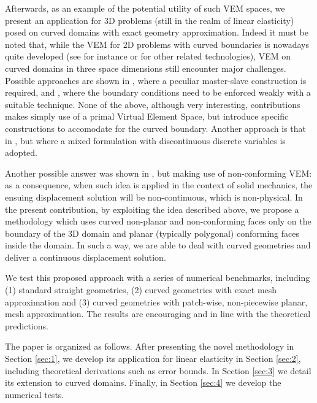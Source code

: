 \documentclass[a4paper,11pt]{article}
\theoremstyle{remark}
\theoremstyle{definition}
\begin{document}
Afterwards, as an example of the potential utility of such VEM spaces, we present an application for 3D problems (still in the realm of linear elasticity) posed on curved domains with exact geometry approximation. Indeed it must be noted that, while the VEM for 2D problems with curved boundaries is nowadays quite developed (see for instance \cite{BeiraodaVeiga-Russo-Vacca:2019, BeiraodaVeiga-Brezzi-Marini-Russo:2020, Aldakheel2020, art-bdv-das, wriggers2020virtual, Dassi-Fumagalli-Losapio-Scialo-Scotti-Vacca,Dassi-Fumagalli-Mazzieri-Scotti-Vacca,da2024c} or \cite{Botti-DiPietro:2018,Yemm:2023,Warburton2013,Chan2017,Kawecki2020} for other related technologies), VEM on curved domains in three space dimensions still encounter major challenges. Possible approaches are shown in \cite{curved3D}, where a peculiar master-slave construction is required, and \cite{bertoluzza2022weakly}, where the boundary conditions need to be enforced weakly with a suitable technique. None of the above, although very interesting, contributions makes simply use of a primal Virtual Element Space, but introduce specific constructions to accomodate for the curved boundary. 
Another approach is that in \cite{DASSI20221}, but where a mixed formulation with discontinuous discrete variables is adopted.

Another possible answer was shown in \cite{curvo-Yi,Liu2025}, but making use of non-conforming VEM: as a consequence, when such idea is applied in the context of solid mechanics, the ensuing displacement solution will be non-continuous, which is non-physical. In the present contribution, by exploiting the idea described above, we propose a methodology which uses curved non-planar and non-conforming faces only on the boundary of the 3D domain and planar (typically polygonal) conforming faces inside the domain. In such a way, we are able to deal with curved geometries and deliver a continuous displacement solution. 

We test this proposed approach with a series of numerical benchmarks, including (1) standard straight geometries, (2) curved geometries with exact mesh approximation and (3) curved geometries with patch-wise, non-piecewise planar, mesh approximation. The results are encouraging and in line with the theoretical predictions.

The paper is organized as follows. After presenting the novel methodology in Section \ref{sec:1}, we develop its application for linear elasticity in Section \ref{sec:2}, including theoretical derivations such as error bounds. In Section \ref{sec:3} we detail its extension to curved domains. Finally, in Section \ref{sec:4} we develop the numerical tests. 
\end{document}
